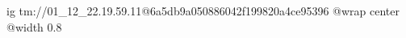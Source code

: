  
 
 
 
 

\qqSecCmtScr


\ifcmt
  ig tm://01_12_22.19.59.11@6a5db9a050886042f199820a4ce95396
  @wrap center
  @width 0.8
\fi

